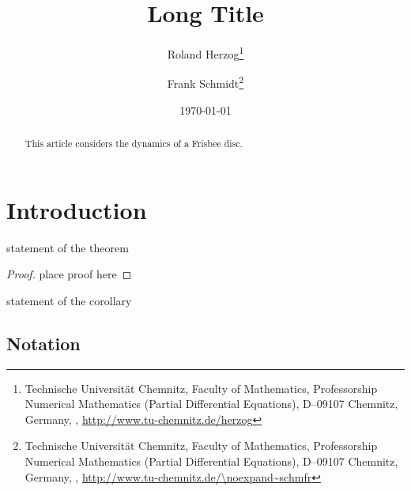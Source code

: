 \documentclass[english,framed_theorems]{numapde_preprint}
\begin{document}
\title[Short Title]{Long Title}
\subtitle{}
\author[Herzog, Schmidt]{Roland Herzog\footnote{Technische Universität Chemnitz, Faculty of Mathematics, Professorship Numerical Mathematics (Partial Differential Equations), D--09107 Chemnitz, Germany, , \url{http://www.tu-chemnitz.de/herzog}} \and Frank Schmidt\footnote{Technische Universität Chemnitz, Faculty of Mathematics, Professorship Numerical Mathematics (Partial Differential Equations), D--09107 Chemnitz, Germany, , \url{http://www.tu-chemnitz.de/\noexpand~schmfr}}}
\date{\today}
\publishers{}
\dedication{}
\maketitle
\thispagestyle{empty}

\begin{abstract}
	This article considers the dynamics of a Frisbee disc.
\end{abstract}

\section{Introduction}
\label{sec:Introduction}

\begin{theorem}
	\label{theorem:first_theorem}
	statement of the theorem
\end{theorem}
\begin{proof}
	place proof here
\end{proof}

\begin{corollary}
	\label{corollary:first_theorem}
	statement of the corollary
\end{corollary}

\subsection{Notation}
\label{subsec:Notation}


% 
% 
\end{document}
